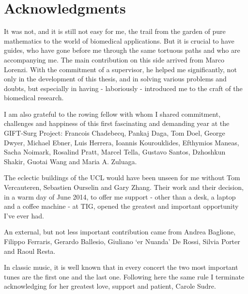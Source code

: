 
\qquad
\pagestyle{empty}
\newpage

\section*{Acknowledgments}
%
%

It was not, and it is still not easy for me, the trail from the garden of pure mathematics to the world of biomedical applications. But it is crucial to have guides, who have gone before me through the same tortuous paths and who are accompanying me. The main contribution on this side arrived from Marco Lorenzi. With the commitment of a supervisor, he helped me significantly, not only in the development of this thesis, and in solving various problems and doubts, but especially in having - laboriously - introduced me to the craft of the biomedical research.

I am also grateful to the rowing fellow with whom I shared commitment, challenges and happiness of this first fascinating and demanding year at the GIFT-Surg Project: 
Francois Chadebecq, 
Pankaj Daga, 
Tom Doel, 
George Dwyer,
Michael Ebner,
Luis Herrera,
Ioannis Kourouklides,
Efthymios Maneas,
Sacha Noimark,
Rosalind Pratt,
Marcel Tella,
Gustavo Santos,
Dzhoshkun Shakir,
Guotai Wang and Maria A. Zuluaga.

The eclectic buildings of the UCL would have been unseen for me without Tom Vercauteren, Sebastien Ourselin and Gary Zhang. Their work and their decision, in a warm day of June 2014, to offer me support - other than a desk, a laptop and a coffee machine - at TIG, opened the greatest and important opportunity I've ever had.

 An external, but not less important contribution came from Andrea Baglione, Filippo Ferraris, Gerardo Ballesio, Giuliano `er Nuanda' De Rossi, Silvia Porter and Raoul Resta. 
 
In classic music, it is well known that in every concert the two most important tunes are the first one and the last one. Following here the same rule I terminate acknowledging for her greatest love, support and patient, Carole Sudre.

